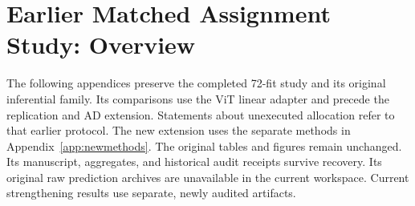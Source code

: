 \clearpage
\section{Earlier Matched Assignment Study: Overview}
\label{app:historicalv3}
The following appendices preserve the completed 72-fit study and its original inferential family.
Its comparisons use the ViT linear adapter and precede the replication and AD extension.
Statements about unexecuted allocation refer to that earlier protocol.
The new extension uses the separate methods in Appendix~\ref{app:newmethods}.
The original tables and figures remain unchanged.
Its manuscript, aggregates, and historical audit receipts survive recovery.
Its original raw prediction archives are unavailable in the current workspace.
Current strengthening results use separate, newly audited artifacts.




